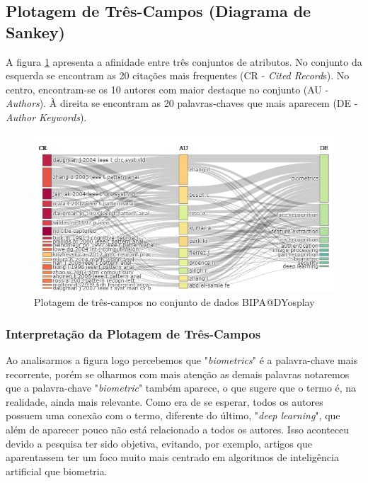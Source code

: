 \subsection{Plotagem de Três-Campos (Diagrama de Sankey)}
\label{sec:BIPA@DYosplayPlotagemTresCampos}

A figura \ref{fig:TFP10BIPA@DYOSPLAY} apresenta a afinidade entre três conjuntos de atributos. No conjunto da esquerda se encontram as 20 citações mais frequentes (CR - \textit{Cited Record}s). No centro, encontram-se os 10 autores com maior destaque no conjunto (AU - \textit{Authors}). À direita se encontram as 20 palavras-chaves que mais aparecem (DE - \textit{Author Keywords}).

\begin{figure}[H]
    \centering
    \includegraphics[width=1\textwidth]{experiments/DYosplay/PesquisaBibliometrica/Imagens/BIPA@DYosplay_Three-FieldsPlot10.png}
    \caption{Plotagem de três-campos no conjunto de dados BIPA@DYosplay}
    \label{fig:TFP10BIPA@DYOSPLAY}
\end{figure}

\subsubsection{Interpretação da Plotagem de Três-Campos}

Ao analisarmos a figura logo percebemos que "\textit{biometrics}" é a palavra-chave mais recorrente, porém se olharmos com mais atenção as demais palavras notaremos que a palavra-chave "\textit{biometric}" também aparece, o que sugere que o termo é, na realidade, ainda mais relevante. Como era de se esperar, todos os autores possuem uma conexão com o termo, diferente do último, "\textit{deep learning}", que além de aparecer pouco não está relacionado a todos os autores. Isso aconteceu devido a pesquisa ter sido objetiva, evitando, por exemplo, artigos que aparentassem ter um foco muito mais centrado em algoritmos de inteligência artificial que biometria.


